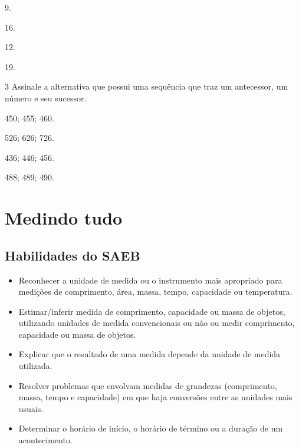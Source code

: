 \begin{escolha}

\begin{multicols}{2}

\item 9.

\item 16.
\end{multicols}


\begin{multicols}{2}

\item 12.

\item 19.
\end{multicols}
\end{escolha}

\num{3} Assinale a alternativa que possui uma sequência que traz um antecessor, um número e seu sucessor.

\begin{escolha}
\item 450; 455; 460.

\item 526; 626; 726.

\item 436; 446; 456.

\item 488; 489; 490.
\end{escolha}

\chapter{Medindo tudo}

\enlargethispage{3\baselineskip}

\section*{Habilidades do SAEB}

\begin{itemize}
\item Reconhecer a unidade de medida ou o instrumento mais apropriado para
medições de comprimento, área, massa, tempo, capacidade ou temperatura.

\item Estimar/inferir medida de comprimento, capacidade ou massa de objetos,
utilizando unidades de medida convencionais ou não ou medir comprimento,
capacidade ou massa de objetos.

\item Explicar que o resultado de uma medida depende da unidade de medida
utilizada.

\item Resolver problemas que envolvam medidas de grandezas (comprimento,
massa, tempo e capacidade) em que haja conversões entre as unidades mais
usuais.

\item Determinar o horário de início, o horário de término ou a duração de
um acontecimento.
\end{itemize}

